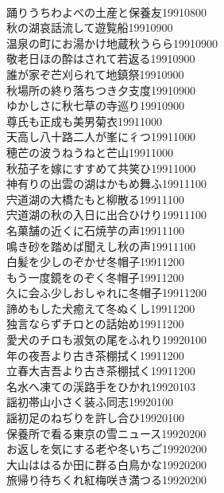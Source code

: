 \begin{multicols}{2}
\\踊りうちわよべの土産と保養友\hfill{19910800}
\\秋の湖哀話流して遊覧船\hfill{19910900}
\\温泉の町にお湯かけ地蔵秋うらら\hfill{19910900}
\\敬老日ほの酔はされて若返る\hfill{19910900}
\\誰が家ぞ芒刈られて地鎮祭\hfill{19910900}
\\秋場所の終り落ちつき夕支度\hfill{19910900}
\\ゆかしさに秋七草の寺巡り\hfill{19910900}
\\尊氏も正成も美男菊衣\hfill{19911000}
\\天高し八十路二人が峯に彳つ\hfill{19911000}
\\穂芒の波うねうねと芒山\hfill{19911000}
\\秋茄子を嫁にすすめて共笑ひ\hfill{19911000}
\\神有りの出雲の湖はかもめ舞ふ\hfill{19911100}
\\宍道湖の大橋たもと柳散る\hfill{19911100}
\\宍道湖の秋の入日に出合ひけり\hfill{19911100}
\\名菓舗の近くに石焼芋の声\hfill{19911100}
\\鳴き砂を踏めば聞えし秋の声\hfill{19911100}
\\白髪を少しのぞかせ冬帽子\hfill{19911200}
\\もう一度鏡をのぞく冬帽子\hfill{19911200}
\\久に会ふ少しおしゃれに冬帽子\hfill{19911200}
\\諦めもした犬癒えて冬ぬくし\hfill{19911200}
\\独言ならずチロとの話始め\hfill{19911200}
\\愛犬のチロも淑気の尾をふれり\hfill{19920100}
\\年の夜吾より古き茶棚拭く\hfill{19911200}
\\立春大吉吾より古き茶棚拭く\hfill{19911200}
\\名水へ凍ての渓路手をひかれ\hfill{19920103}
\\謡初帯山小さく装ふ同志\hfill{19920100}
\\謡初足のねぢりを許し合ひ\hfill{19920100}
\\保養所で看る東京の雪ニュース\hfill{19920200}
\\お返しを気にする老や冬いちご\hfill{19920200}
\\大山ははるか田に群る白鳥かな\hfill{19920200}
\\旅帰り待ちくれ紅梅咲き満つる\hfill{19920200}

\end{multicols}
